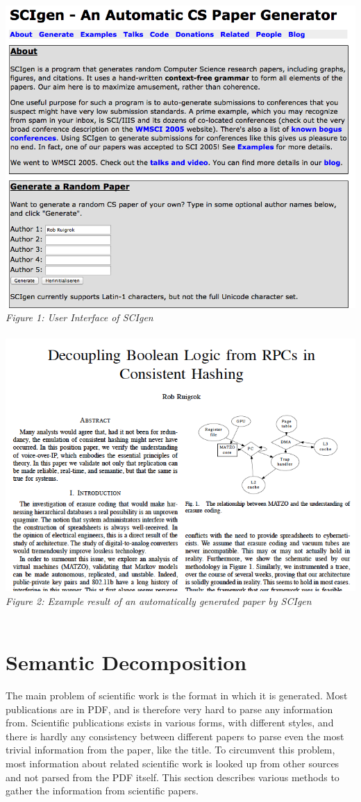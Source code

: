 \documentclass[12pt]{article}
\begin{document}
\includegraphics[width=17cm]{../screenshots/scigen.png}
\textit{\\Figure 1: User Interface of SCIgen}\\\\

\includegraphics[width=17cm]{../screenshots/example-scigen.png}
\textit{\\Figure 2: Example result of an automatically generated paper by SCIgen}\\\\

\section{Semantic Decomposition}
The main problem of scientific work is the format in which it is generated. Most publications are in PDF, and is therefore very hard to parse any information from. Scientific publications exists in various forms, with different styles, and there is hardly any consistency between different papers to parse even the most trivial information from the paper, like the title. To circumvent this problem, most information about related scientific work is looked up from other sources and not parsed from the PDF itself. This section describes various methods to gather the information from scientific papers.
\end{document}

